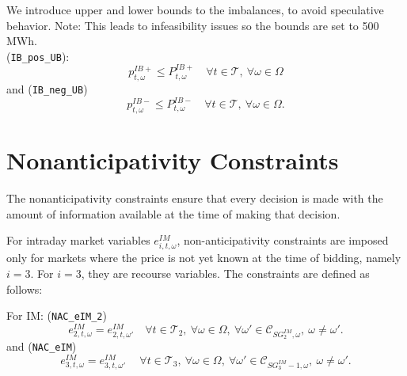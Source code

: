 \documentclass{article}
\begin{document}
We introduce upper and lower bounds to the imbalances, to avoid speculative behavior.
Note: This leads to infeasibility issues so the bounds are set to 500 MWh.\\

(\verb|IB_pos_UB|):\\
\begin{equation} \label{EQ:VPP_IB_MAX}
	p_{t, \omega}^{IB+} \leq P_{t, \omega}^{IB+} \quad \forall t \in \mathcal{T}, \ \forall \omega \in \Omega
\end{equation}
and (\verb|IB_neg_UB|)
\begin{equation} \label{EQ:VPP_IB_MIN}
	p_{t, \omega}^{IB-} \leq P_{t, \omega}^{IB-} \quad \forall t \in \mathcal{T}, \ \forall \omega \in \Omega.
\end{equation}




\section{Nonanticipativity Constraints}
\label{SEC:NonanticipativityConstraints}

The nonanticipativity constraints ensure that every decision is made with the amount of information available at the time of making that decision.

For intraday market variables \( e^{IM}_{i,t,\omega} \), non-anticipativity constraints are imposed only for markets where the price is not yet known at the time of bidding, namely \( i = 3 \). For $i = 3$, they are recourse variables. The constraints are defined as follows:

For IM: (\verb|NAC_eIM_2|)
  \begin{equation} \label{EQ:NAC_eIM2}
  	e^{IM}_{2, t, \omega} = e^{IM}_{2, t, \omega'} \quad 
  	\forall t \in \mathcal{T}_2, \ 
  	\forall \omega \in \Omega, \ 
  	\forall \omega' \in \mathcal{C}_{SG^{IM}_2, \omega}, \ \omega \neq \omega'.
  \end{equation}
  and (\verb|NAC_eIM|)
\begin{equation} \label{EQ:NAC_eIM}
	e^{IM}_{3, t, \omega} = e^{IM}_{3, t, \omega'} \quad 
	 \ \forall t \in \mathcal{T}_3, \ 
	\forall \omega \in \Omega, \ 
	\forall \omega' \in \mathcal{C}_{SG^{IM}_3 - 1, \omega}, \ \omega \neq \omega'.
\end{equation}
\end{document}
